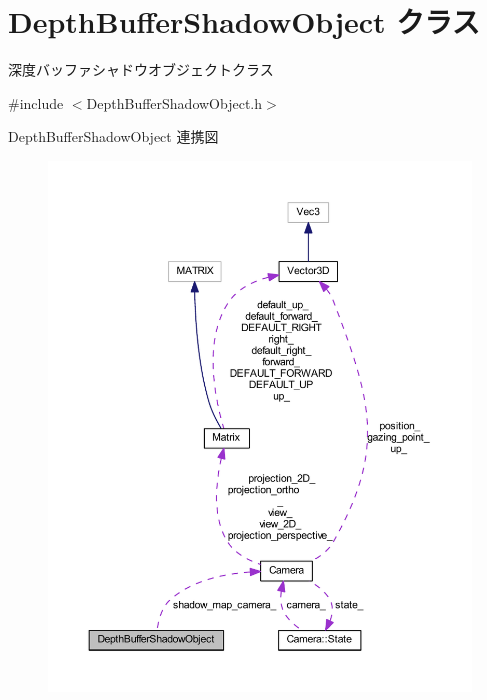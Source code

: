 \hypertarget{class_depth_buffer_shadow_object}{}\section{Depth\+Buffer\+Shadow\+Object クラス}
\label{class_depth_buffer_shadow_object}


深度バッファシャドウオブジェクトクラス  




{\ttfamily \#include $<$Depth\+Buffer\+Shadow\+Object.\+h$>$}



Depth\+Buffer\+Shadow\+Object 連携図\nopagebreak
\begin{figure}[H]
\begin{center}
\leavevmode
\includegraphics[width=350pt]{class_depth_buffer_shadow_object__coll__graph}
\end{center}
\end{figure}
